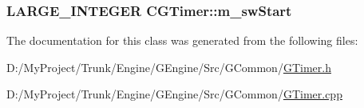 \subsubsection[{m\+\_\+sw\+Start}]{\setlength{\rightskip}{0pt plus 5cm}L\+A\+R\+G\+E\+\_\+\+I\+N\+T\+E\+G\+E\+R C\+G\+Timer\+::m\+\_\+sw\+Start\hspace{0.3cm}{\ttfamily [static]}}\label{class_c_g_timer_a43633ab372669c28b164e59b4d33c905}


The documentation for this class was generated from the following files\+:\begin{DoxyCompactItemize}
\item 
D\+:/\+My\+Project/\+Trunk/\+Engine/\+G\+Engine/\+Src/\+G\+Common/\hyperlink{_g_timer_8h}{G\+Timer.\+h}\item 
D\+:/\+My\+Project/\+Trunk/\+Engine/\+G\+Engine/\+Src/\+G\+Common/\hyperlink{_g_timer_8cpp}{G\+Timer.\+cpp}\end{DoxyCompactItemize}
